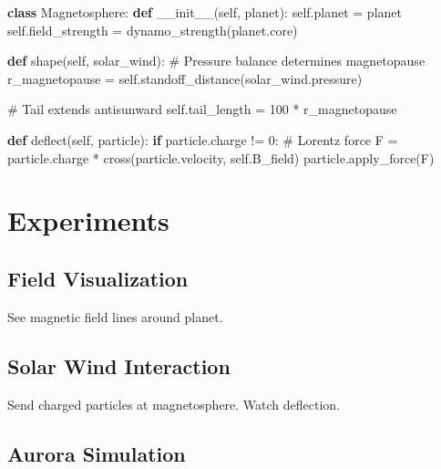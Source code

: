 \documentclass[
  11pt,
  letterpaper,
  twoside,
  openright]{book}
\newenvironment{Shaded}{\begin{snugshade}}{\end{snugshade}}
\newcommand{\CommentTok}[1]{\textcolor[rgb]{0.37,0.37,0.37}{#1}}
\newcommand{\ControlFlowTok}[1]{\textcolor[rgb]{0.00,0.23,0.31}{\textbf{#1}}}
\newcommand{\DecValTok}[1]{\textcolor[rgb]{0.68,0.00,0.00}{#1}}
\newcommand{\FunctionTok}[1]{\textcolor[rgb]{0.28,0.35,0.67}{#1}}
\newcommand{\KeywordTok}[1]{\textcolor[rgb]{0.00,0.23,0.31}{\textbf{#1}}}
\newcommand{\NormalTok}[1]{\textcolor[rgb]{0.00,0.23,0.31}{#1}}
\newcommand{\OperatorTok}[1]{\textcolor[rgb]{0.37,0.37,0.37}{#1}}
\newcommand{\VariableTok}[1]{\textcolor[rgb]{0.07,0.07,0.07}{#1}}
\begin{document}
\begin{Shaded}
\begin{Highlighting}[]
\KeywordTok{class}\NormalTok{ Magnetosphere:}
    \KeywordTok{def} \FunctionTok{\_\_init\_\_}\NormalTok{(}\VariableTok{self}\NormalTok{, planet):}
        \VariableTok{self}\NormalTok{.planet }\OperatorTok{=}\NormalTok{ planet}
        \VariableTok{self}\NormalTok{.field\_strength }\OperatorTok{=}\NormalTok{ dynamo\_strength(planet.core)}

    \KeywordTok{def}\NormalTok{ shape(}\VariableTok{self}\NormalTok{, solar\_wind):}
        \CommentTok{\# Pressure balance determines magnetopause}
\NormalTok{        r\_magnetopause }\OperatorTok{=} \VariableTok{self}\NormalTok{.standoff\_distance(solar\_wind.pressure)}

        \CommentTok{\# Tail extends antisunward}
        \VariableTok{self}\NormalTok{.tail\_length }\OperatorTok{=} \DecValTok{100} \OperatorTok{*}\NormalTok{ r\_magnetopause}

    \KeywordTok{def}\NormalTok{ deflect(}\VariableTok{self}\NormalTok{, particle):}
        \ControlFlowTok{if}\NormalTok{ particle.charge }\OperatorTok{!=} \DecValTok{0}\NormalTok{:}
            \CommentTok{\# Lorentz force}
\NormalTok{            F }\OperatorTok{=}\NormalTok{ particle.charge }\OperatorTok{*}\NormalTok{ cross(particle.velocity, }\VariableTok{self}\NormalTok{.B\_field)}
\NormalTok{            particle.apply\_force(F)}
\end{Highlighting}
\end{Shaded}

\section{Experiments}\label{experiments-18}

\subsection{Field Visualization}\label{field-visualization}

See magnetic field lines around planet.

\subsection{Solar Wind Interaction}\label{solar-wind-interaction}

Send charged particles at magnetosphere. Watch deflection.

\subsection{Aurora Simulation}\label{aurora-simulation}
\end{document}
